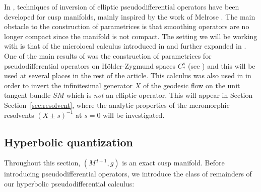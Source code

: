 \documentclass[JEP,XML,SOM,Unicode,NoFloatCountersInSection]{cedram}
\theoremstyle{plain}
\theoremstyle{definition}
\begin{document}
In \cite{Bonthonneau-Lefeuvre-19-1}, techniques of inversion of elliptic pseudodifferential operators have been developed for cusp manifolds, mainly inspired by the work of Melrose \cite{Melrose-APS-93}. The main obstacle to the construction of parametrices is that smoothing operators are no longer compact since the manifold is not compact. The setting we will be working with is that of the microlocal calculus introduced in \cite{Bonthonneau-16} and further expanded in \cite{Bonthonneau-Weich-17}. One of the main results of \cite{Bonthonneau-Lefeuvre-19-1} was the construction of parametrices for pseudodifferential operators on Hölder-Zygmund spaces $C^s_*$ (see \cite[\S 3]{Bonthonneau-Lefeuvre-19-1}) and this will be used at several places in the rest of the article. This calculus was also used in \cite{Bonthonneau-Weich-17} in order to invert the infinitesimal generator $X$ of the geodesic flow on the unit tangent bundle $SM$ which is \emph{not} an elliptic operator. This will appear in Section Section~\ref{sec:resolvent}, where the analytic properties of the meromorphic resolvents $(X\pm s)^{-1}$ at $s=0$ will be investigated.

\subsection{Hyperbolic quantization}

\label{ssection:hq}
Throughout this section, $(M^{d+1},g)$ is an exact cusp manifold. Before introducing pseudodifferential operators, we introduce the class of remainders of our hyperbolic pseudodifferential calculus:
\end{document}
